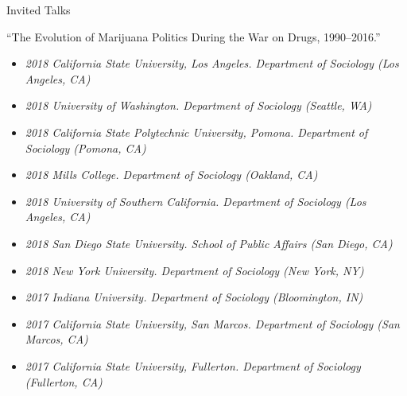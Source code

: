 \documentclass{resume} %
\begin{document}

\begin{rSection}{Invited Talks}

``The Evolution of Marijuana Politics During the War on Drugs, 1990--2016.''
\vspace*{-.75em} 
\begin{itemize}[leftmargin=.25in]
\item {\footnotesize \it 2018 California State University, Los Angeles. Department of Sociology (Los Angeles, CA)}\vspace*{-.75em} 
\item {\footnotesize \it 2018 University of Washington. Department of Sociology (Seattle, WA)} \vspace*{-.75em} 
\item {\footnotesize \it 2018 California State Polytechnic University, Pomona. Department of Sociology (Pomona, CA)}\vspace*{-.75em} 
\item {\footnotesize \it 2018 Mills College. Department of Sociology (Oakland, CA)} \vspace*{-.75em} 
\item {\footnotesize \it 2018 University of Southern California. Department of Sociology (Los Angeles, CA)} \vspace*{-.75em} 
\item {\footnotesize \it 2018 San Diego State University. School of Public Affairs (San Diego, CA)} \vspace*{-.75em} 
\item {\footnotesize \it 2018 New York University. Department of Sociology (New York, NY)} \vspace*{-.75em} 
\item {\footnotesize \it 2017 Indiana University. Department of Sociology (Bloomington, IN)} \vspace*{-.75em} 
\item {\footnotesize \it 2017 California State University, San Marcos. Department of Sociology (San Marcos, CA)} \vspace*{-.75em} 
\item {\footnotesize \it 2017 California State University, Fullerton. Department of Sociology (Fullerton, CA)}
\end{itemize} 

\end{rSection}
\end{document}

